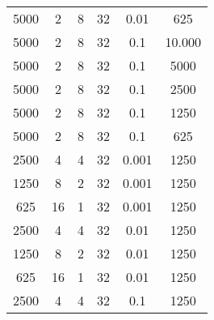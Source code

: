 \begin{tabularx}{\linewidth}{ |c|c|c|c|c|c|  }
    5000 & 2   & 8     & 32  & 0.01  & 625                                                                                                                                \\
    5000 & 2   & 8     & 32  & 0.1   & 10.000                                                                                                                             \\
    5000 & 2   & 8     & 32  & 0.1   & 5000                                                                                                                               \\
    5000 & 2   & 8     & 32  & 0.1   & 2500                                                                                                                               \\
    5000 & 2   & 8     & 32  & 0.1   & 1250                                                                                                                               \\
    5000 & 2   & 8     & 32  & 0.1   & 625                                                                                                                                \\
    2500 & 4   & 4     & 32  & 0.001 & 1250                                                                                                                               \\
    1250 & 8   & 2     & 32  & 0.001 & 1250                                                                                                                               \\
    625  & 16  & 1     & 32  & 0.001 & 1250                                                                                                                               \\
    2500 & 4   & 4     & 32  & 0.01  & 1250                                                                                                                               \\
    1250 & 8   & 2     & 32  & 0.01  & 1250                                                                                                                               \\
    625  & 16  & 1     & 32  & 0.01  & 1250                                                                                                                               \\
    2500 & 4   & 4     & 32  & 0.1   & 1250                                                                                                                               \\

\end{tabularx}
